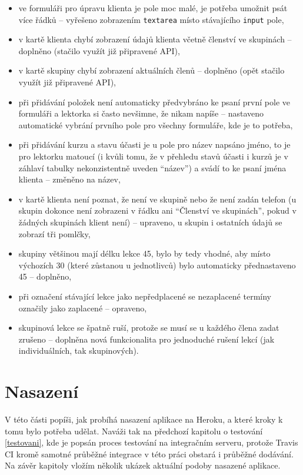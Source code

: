         \begin{itemize}
            \item ve formuláři pro úpravu klienta je pole moc malé, je potřeba umožnit psát více řádků -- vyřešeno zobrazením \verb|textarea| místo stávajícího \verb|input| pole,
            \item v kartě klienta chybí zobrazení údajů klienta včetně členství ve skupinách -- doplněno (stačilo využít již připravené API),
            \item v kartě skupiny chybí zobrazení aktuálních členů -- doplněno (opět stačilo využít již připravené API),
            \item při přidávání položek není automaticky předvybráno ke psaní první pole ve formuláři a lektorka si často nevšimne, že nikam napíše -- nastaveno automatické vybrání prvního pole pro všechny formuláře, kde je to potřeba,
            \item při přidávání kurzu a stavu účasti je u pole pro název napsáno jméno, to je pro lektorku matoucí (i kvůli tomu, že v přehledu stavů účasti i kurzů je v záhlaví tabulky nekonzistentně uveden \enquote{název}) a svádí to ke psaní jména klienta -- změněno na název,
            \item v kartě klienta není poznat, že není ve skupině nebo že není zadán telefon (u skupin dokonce není zobrazeni v řádku ani \enquote{Členství ve skupinách}, pokud v žádných skupinách klient není) -- upraveno, u skupin i ostatních údajů se zobrazí tři pomlčky,
            \item skupiny většinou mají délku lekce 45, bylo by tedy vhodné, aby místo výchozích 30 (které zůstanou u jednotlivců) bylo automaticky přednastaveno 45 -- doplněno,
            \item při označení stávající lekce jako nepředplacené se nezaplacené termíny označily jako zaplacené -- opraveno,
            \item skupinová lekce se špatně ruší, protože se musí se u každého člena zadat zrušeno -- doplněna nová funkcionalita pro jednoduché rušení lekcí (jak individuálních, tak skupinových).
        \end{itemize}
        
        
\chapter{Nasazení}\label{nasazeni}
    V této části popíši, jak probíhá nasazení aplikace na Heroku, a které kroky k tomu bylo potřeba udělat. Naváži tak na předchozí kapitolu o testování \ref{testovani}, kde je popsán proces testování na integračním serveru, protože Travis CI kromě samotné průběžné integrace v této práci obstará i průběžné dodávání. Na závěr kapitoly vložím několik ukázek aktuální podoby nasazené aplikace.
    
